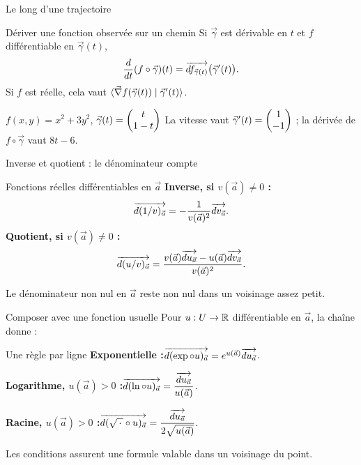 \begin{frame}[t]{Le long d’une trajectoire}
\coursanalyse
\begin{theoreme}{Dériver une fonction observée sur un chemin}
Si $\vec\gamma$ est dérivable en $t$ et $f$ différentiable en $\vec\gamma(t)$,
\[\frac{d}{dt}(f\circ\vec\gamma)(t)=\overrightarrow{df_{\vec\gamma(t)}}\bigl(\vec\gamma'(t)\bigr).\]
Si $f$ est réelle, cela vaut $\langle \vec\nabla f(\vec\gamma(t))\mid \vec\gamma'(t)\rangle$.
\end{theoreme}
\begin{exemple}{$f(x,y)=x^2+3y^2$, $\vec\gamma(t)=\begin{pmatrix}t\\1-t\end{pmatrix}$}
La vitesse vaut $\vec\gamma'(t)=\begin{pmatrix}1\\-1\end{pmatrix}$ ; la dérivée de $f\circ\vec\gamma$ vaut $8t-6$.
\end{exemple}
\end{frame}

\begin{frame}[t]{Inverse et quotient : le dénominateur compte}
\coursanalyse
\begin{theoreme}{Fonctions réelles différentiables en $\vec a$}
\textbf{Inverse, si $v(\vec a)\ne0$ :}
\[\overrightarrow{d(1/v)_{\vec a}}=-\frac{1}{v(\vec a)^2}\overrightarrow{dv_{\vec a}}.\]
\textbf{Quotient, si $v(\vec a)\ne0$ :}
\[\overrightarrow{d(u/v)_{\vec a}}=\frac{v(\vec a)\overrightarrow{du_{\vec a}}-u(\vec a)\overrightarrow{dv_{\vec a}}}{v(\vec a)^2}.\]
\end{theoreme}
\vfill Le dénominateur non nul en $\vec a$ reste non nul dans un voisinage assez petit.
\end{frame}

\begin{frame}[t]{Composer avec une fonction usuelle}
\coursanalyse
Pour $u:U\to\mathbb R$ différentiable en $\vec a$, la chaîne donne :
\begin{cours}{Une règle par ligne}
\textbf{Exponentielle :}\quad $\overrightarrow{d(\exp\circ u)_{\vec a}}=e^{u(\vec a)}\overrightarrow{du_{\vec a}}$.

\bigskip
\textbf{Logarithme, $u(\vec a)>0$ :}\quad $\overrightarrow{d(\ln\circ u)_{\vec a}}=\dfrac{\overrightarrow{du_{\vec a}}}{u(\vec a)}$.

\bigskip
\textbf{Racine, $u(\vec a)>0$ :}\quad $\overrightarrow{d(\sqrt{\,\cdot\,}\circ u)_{\vec a}}=\dfrac{\overrightarrow{du_{\vec a}}}{2\sqrt{u(\vec a)}}$.
\end{cours}
\vfill Les conditions assurent une formule valable dans un voisinage du point.

\end{frame}

